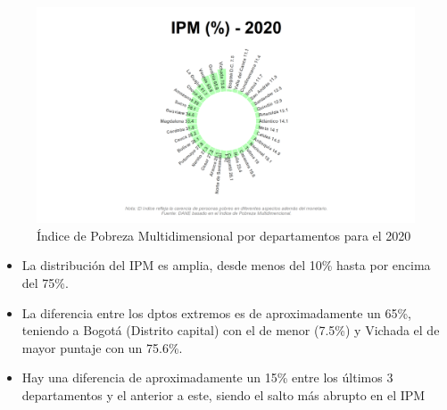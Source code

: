     \begin{figure}[H]
        \caption{Índice de Pobreza Multidimensional por departamentos para el 2020 \label{map_result_2} }
        \begin{center}
        \includegraphics[width=\textwidth,keepaspectratio]{img/var_268_static.png}
        \end{center}
    \end{figure}
            \begin{itemize}
                    \item La distribución del IPM es amplia, desde menos del 10\% hasta por encima del 75\%.
                    \item La diferencia entre los dptos extremos es de aproximadamente un 65\%, teniendo a Bogotá (Distrito capital) con el de menor (7.5\%) y Vichada el de mayor puntaje con un 75.6\%.  
                    \item Hay una diferencia de aproximadamente un 15\% entre los últimos 3 departamentos y el anterior a este, siendo el salto más abrupto en el IPM
                    \end{itemize}

